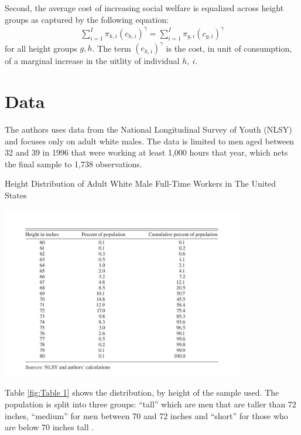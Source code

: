 \documentclass[titlepage]{\econtex}
\begin{document}
  Second, the average cost of increasing social welfare is equalized across height groups as captured by the following equation:
\begin{align}
  \sum_{i=1}^I \pi_{h,i} (c_{h,i})^\gamma =  \sum_{i=1}^I \pi_{g,i} (c_{g,i})^\gamma
  \end{align}
  for all height groups $g,h$. The term $(c_{h,i})^\gamma$ is the cost, in unit of consumption, of a marginal increase in the uitlity of individual $h, \ i$.

\hypertarget{Data}{}
\section{Data}

The authors uses data from the National Longitudinal Survey of Youth (NLSY) and focuses only on adult white males. The data is limited to men aged between 32 and 39 in 1996 that were working at least 1,000 hours that year, which nets the final sample to 1,738 observations.

\begin{table}[H]
  \centering
    \caption{Height Distribution of Adult White Male Full-Time Workers in The United States}
    \includegraphics[width=0.8\textwidth]{HeightDistribution.JPG}
    \label{fig:Table 1}
  \end{table}
  
  Table \ref{fig:Table 1} shows the distribution, by height of the sample used. The population is split into three groups: ``tall'' which are men that are taller than 72 inches, ``medium'' for men  between 70 and 72 inches and ``short'' for those who are below 70 inches tall .
  
\end{document}
